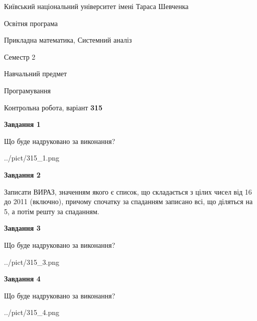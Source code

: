 \documentclass[12pt, ukrainian]{article}
\begin{document}
{{\begin {small}\par
{ \center  Київський національний університет імені Тараса Шевченка \par}
{\parbox {5 cm}{Освітня програма \hfill}{\parbox {8 cm}{Прикладна математика, Системний аналіз \hfill}}\parbox {5 cm}{\hfill Семестр 2}}\par
{\parbox {5 cm} {Навчальний предмет \hfill}\parbox {7 cm}{Програмування \hfill}\parbox {6cm}{\hfill}\par}\vspace{-7pt} \end{small}}{\center Контрольна робота, варіант  \No \textbf
{ 315 }\par}}
{
\begin {large}
{\begin {center}\textbf{Завдання 1}\end {center}}\par
Що буде надруковано за виконання?\par\par
\begin{center}
	{../pict/315_1.png}
\end{center}
\newpage

{\begin {center}\textbf{Завдання 2}\end {center}}\par

Записати ВИРАЗ, значенням якого є список, що складається з цілих чисел від 16 до 2011 (включно), причому спочатку за спаданням записано всі, що діляться на 5, а потім решту за спаданням.\par
\newpage

{\begin {center}\textbf{Завдання 3}\end {center}}\par
Що буде надруковано за виконання?
\begin{center}
	{../pict/315_3.png}
\end{center}
\newpage

{\begin {center}\textbf{Завдання 4}\end {center}}\par
Що буде надруковано за виконання?\par
\begin{center}
	{../pict/315_4.png}
\end{center}
\newpage


\end{large}}
\end{document}

